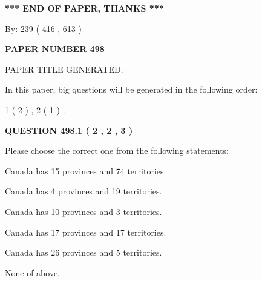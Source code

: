 \documentclass[12pt]{article}
\begin{document}
   
\vspace{1.0in} 
{\textbf{\large{ *** END OF PAPER, THANKS *** }}} 
   
   
\hspace{1.0in} By: 
 239 ( 416 ,  613 )
   
   
   
   
\newpage 
\setcounter{page}{ 
   498001 } 
   
   
   
   
 {\textbf{ \Large{ PAPER NUMBER  498  }}}
   
   
\vspace{0.2in}
   
   
   
   
   
   
   
   
 \vspace{0.2in}
 
 
 
 
   
   
 PAPER TITLE GENERATED.
   
   
   
\vspace{0.2in}
   
In this paper, big questions will be generated in the following order: 
   
   
   1 ( 2 )
 ,
   2 ( 1 )
 .
  
\vspace{0.2in}
  
{\textbf{\Large{QUESTION
498.1 
 ( 2 , 2 , 3 )
}}}
  
  
Please choose the correct one from the following statements:
 
 
Canada has  15 provinces and  74 territories.
 
 
Canada has   4 provinces and  19 territories.
 
 
Canada has 10  provinces and 3 territories.
 
 
Canada has  17 provinces and  17 territories.
 
 
Canada has  26 provinces and  5 territories.
 
 
 None of above.
 
 
\noindent{}
 
\end{document}
